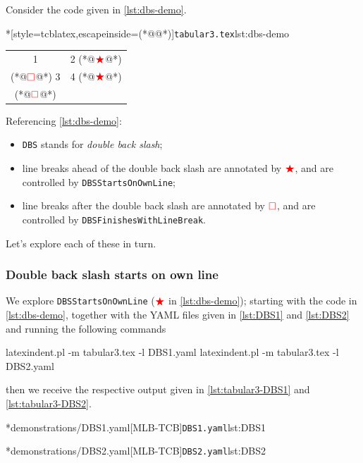 	Consider the code given in \cref{lst:dbs-demo}.
	\begin{cmhlistings}*[style=tcblatex,escapeinside={(*@}{@*)}]{\texttt{tabular3.tex}}{lst:dbs-demo}
\begin{tabular}{cc}
 1 & 2 (*@$\color{red}\bigstar$@*)\\(*@$\color{red}\square$@*) 3 & 4 (*@$\color{red}\bigstar$@*)\\(*@$\color{red}\square$@*)
\end{tabular}
\end{cmhlistings}
	Referencing \cref{lst:dbs-demo}:
	\begin{itemize}
		\item \texttt{DBS} stands for \emph{double back slash};
		\item line breaks ahead of the double back slash are annotated by $\color{red}\bigstar$,
		      and are controlled by \texttt{DBSStartsOnOwnLine};
		\item line breaks after the double back slash are annotated by $\color{red}\square$, and
		      are controlled by \texttt{DBSFinishesWithLineBreak}.
	\end{itemize}

	Let's explore each of these in turn.

\subsubsection{Double back slash starts on own line}
	We explore \texttt{DBSStartsOnOwnLine} ($\color{red}\bigstar$ in \cref{lst:dbs-demo}); starting with the code in
	\cref{lst:dbs-demo}, together with the YAML files given in
	\cref{lst:DBS1} and \cref{lst:DBS2} and running the following
	commands
	\begin{commandshell}
latexindent.pl -m tabular3.tex -l DBS1.yaml
latexindent.pl -m tabular3.tex -l DBS2.yaml
\end{commandshell}
	then we receive the respective output given in \cref{lst:tabular3-DBS1} and
	\cref{lst:tabular3-DBS2}.

	\begin{cmhtcbraster}[raster column skip=.01\linewidth]
		\cmhlistingsfromfile*[style=yaml-LST]*{demonstrations/DBS1.yaml}[MLB-TCB]{\texttt{DBS1.yaml}}{lst:DBS1}
	\end{cmhtcbraster}

	\begin{cmhtcbraster}[raster column skip=.01\linewidth]
		\cmhlistingsfromfile*[style=yaml-LST]*{demonstrations/DBS2.yaml}[MLB-TCB]{\texttt{DBS2.yaml}}{lst:DBS2}
	\end{cmhtcbraster}

